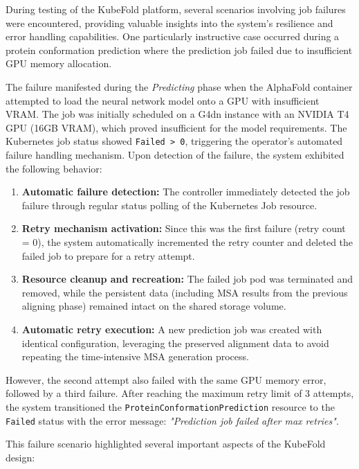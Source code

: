 During testing of the KubeFold platform, several scenarios involving job failures were encountered, providing valuable insights into the system's resilience and error handling capabilities. One particularly instructive case occurred during a protein conformation prediction where the prediction job failed due to insufficient GPU memory allocation.

The failure manifested during the \textit{Predicting} phase when the AlphaFold container attempted to load the neural network model onto a GPU with insufficient VRAM. The job was initially scheduled on a G4dn instance with an NVIDIA T4 GPU (16GB VRAM), which proved insufficient for the model requirements. The Kubernetes job status showed \texttt{Failed > 0}, triggering the operator's automated failure handling mechanism. Upon detection of the failure, the system exhibited the following behavior:

\begin{enumerate}
    \item \textbf{Automatic failure detection:} The controller immediately detected the job failure through regular status polling of the Kubernetes Job resource.
    
    \item \textbf{Retry mechanism activation:} Since this was the first failure (retry count = 0), the system automatically incremented the retry counter and deleted the failed job to prepare for a retry attempt.
    
    \item \textbf{Resource cleanup and recreation:} The failed job pod was terminated and removed, while the persistent data (including MSA results from the previous aligning phase) remained intact on the shared storage volume.
    
    \item \textbf{Automatic retry execution:} A new prediction job was created with identical configuration, leveraging the preserved alignment data to avoid repeating the time-intensive MSA generation process.
\end{enumerate}

However, the second attempt also failed with the same GPU memory error, followed by a third failure. After reaching the maximum retry limit of 3 attempts, the system transitioned the \texttt{ProteinConformationPrediction} resource to the \texttt{Failed} status with the error message: \textit{"Prediction job failed after max retries"}.

This failure scenario highlighted several important aspects of the KubeFold design:

